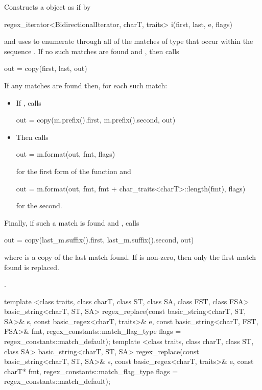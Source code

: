 \begin{itemdescr}
\pnum
{}%
%
\effects
Constructs a  object 
as if by
\begin{codeblock}
regex_iterator<BidirectionalIterator, charT, traits> i(first, last, e, flags)
\end{codeblock}
and uses  to enumerate through all
of the matches  of type 
that occur within the sequence .
If no such
matches are found and
, then calls
\begin{codeblock}
out = copy(first, last, out)
\end{codeblock}
If any matches are found then, for each such match:
\begin{itemize}
\item
If , calls
\begin{codeblock}
out = copy(m.prefix().first, m.prefix().second, out)
\end{codeblock}
\item
Then calls
\begin{codeblock}
out = m.format(out, fmt, flags)
\end{codeblock}
for the first form of the function and
\begin{codeblock}
out = m.format(out, fmt, fmt + char_traits<charT>::length(fmt), flags)
\end{codeblock}
for the second.
\end{itemize}
Finally, if such a match
is found and ,
calls
\begin{codeblock}
out = copy(last_m.suffix().first, last_m.suffix().second, out)
\end{codeblock}
where  is a copy of the last match
found. If 
is non-zero, then only the first match found is replaced.

\pnum\returns {}.
\end{itemdescr}

%
\begin{itemdecl}
template <class traits, class charT, class ST, class SA, class FST, class FSA>
  basic_string<charT, ST, SA>
  regex_replace(const basic_string<charT, ST, SA>& s,
                const basic_regex<charT, traits>& e,
                const basic_string<charT, FST, FSA>& fmt,
                regex_constants::match_flag_type flags =
                  regex_constants::match_default);
template <class traits, class charT, class ST, class SA>
  basic_string<charT, ST, SA>
  regex_replace(const basic_string<charT, ST, SA>& s,
                const basic_regex<charT, traits>& e,
                const charT* fmt,
                regex_constants::match_flag_type flags =
                  regex_constants::match_default);
\end{itemdecl}


